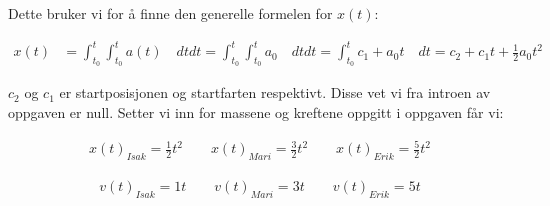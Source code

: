 Dette bruker vi for å finne den generelle formelen for $x(t)$:

\begin{align*}
  x(t)  &= \int_{t_0}^{t}\int_{t_0}^{t}a(t) \quad dt dt
  = \int_{t_0}^{t}\int_{t_0}^{t}a_0 \quad dt dt
  = \int_{t_0}^{t}c_1  + a_0t \quad dt
  =  c_2 + c_1t + \frac{1}{2}a_0t^2
\end{align*}

$c_2$ og $c_1$ er startposisjonen og startfarten respektivt.
Disse vet vi fra introen av oppgaven er null. Setter vi inn for massene og kreftene oppgitt i oppgaven får vi:

\begin{align}
  x(t)_{Isak} = \frac{1}{2}t^2
  \qquad
  x(t)_{Mari} = \frac{3}{2}t^2
  \qquad
  x(t)_{Erik} = \frac{5}{2}t^2
  \label{eq:test_posisjon}
\end{align}

\begin{align}
  v(t)_{Isak} = 1t
  \qquad
  v(t)_{Mari} = 3t
  \qquad
  v(t)_{Erik} = 5t
  \label{eq:test_fart}
\end{align}

